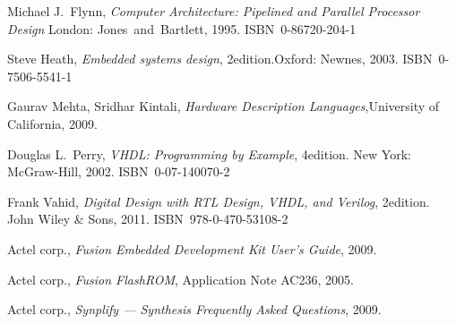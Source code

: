 \documentclass[12pt,a4paper]{article} %
\begin{document}
	
	\clearpage
	\raggedright
	\begin{thebibliography}{9}
			Michael J.~Flynn,
			\textit{Computer Architecture: Pipelined and Parallel Processor Design}
			\linebreak[3]
			London: Jones~and~Bartlett, 1995. ISBN~0-86720-204-1
		
			Steve Heath,
			\textit{Embedded systems design}, 2\nd edition.\linebreak[3]
			Oxford: Newnes, 2003. ISBN~0-7506-5541-1
		
			Gaurav Mehta, Sridhar Kintali,
			\textit{Hardware Description Languages},\linebreak[2]
			University of California, %
			2009.
		
		
			Douglas L.~Perry,
			\textit{VHDL: Programming by Example}, 4\nth edition. \linebreak[2]
			New York: McGraw-Hill, 2002. ISBN~0-07-140070-2
		
			Frank Vahid,
			\textit{Digital Design with RTL Design, VHDL, and Verilog}, 2\nd edition.\linebreak[2]
			John Wiley \& Sons, 2011. ISBN~978-0-470-53108-2
		
			Actel corp.,
			\textit{Fusion Embedded Development Kit User's Guide}, %
			2009.
		
			Actel corp.,
			\textit{Fusion FlashROM}, Application Note AC236, %
			2005.
		
			Actel corp.,
			\textit{Synplify — Synthesis Frequently Asked Questions}, %
			2009.
	\end{thebibliography}
	
\end{document}
